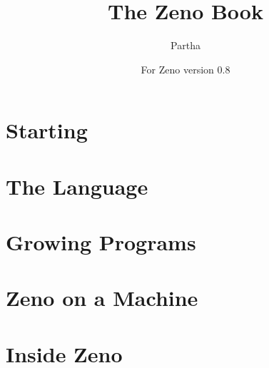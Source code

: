 \documentclass[11pt,a4paper,twoside,openany]{book}
\title{The Zeno Book}
\author{Partha}
\date{For Zeno version 0.8}
\begin{document}
\frontmatter
\zenotitlepage
\zenocopyright
\tableofcontents



\mainmatter

\part{Starting}




\part{The Language}













\part{Growing Programs}

















\part{Zeno on a Machine}









\part{Inside Zeno}



\appendix
\begin{appendixstart}\end{appendixstart}







\end{document}
